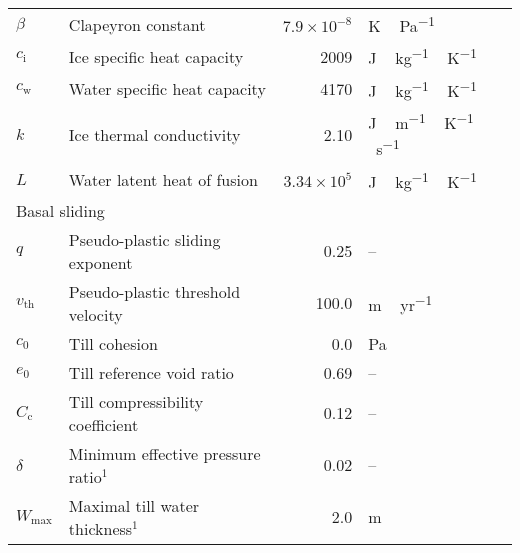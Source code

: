 \documentclass[tc, manuscript]{copernicus}
\begin{document}
\begin{table*}
{\begin{tabular}{llrll}
    $\beta$ & Clapeyron constant
            & $7.9\times10^{-8}$
            & \unit{K\,Pa^{-1}}
            & \citet{Luthi.etal.2002} \\

    $c_{\mathrm{i}}$   & Ice specific heat capacity
            & 2009
            & \unit{J\,kg^{-1}\,K^{-1}}
            & \citet{Aschwanden.etal.2012} \\

    $c_{\mathrm{w}}$   & Water specific heat capacity
            & 4170
            & \unit{J\,kg^{-1}\,K^{-1}}
            & \citet{Aschwanden.etal.2012} \\

    $k$     & Ice thermal conductivity
            & 2.10
            & \unit{J\,m^{-1}\,K^{-1}\,s^{-1}}
            & \citet{Aschwanden.etal.2012} \\

    $L$     & Water latent heat of fusion
            & $3.34\times10^5$
            & \unit{J\,kg^{-1}\,K^{-1}}
            & \citet{Aschwanden.etal.2012} \\

    \cline{1-5}
    \multicolumn{2}{l}{{Basal sliding}} \\
    \cline{1-5}

    $q$     & Pseudo-plastic sliding exponent
            & 0.25
            & --
            & \citet{Aschwanden.etal.2013} \\

    $v_{\text{th}}$& Pseudo-plastic threshold velocity
            & 100.0
            & \unit{m\,yr^{-1}}
            & \citet{Aschwanden.etal.2013} \\

    $c_0$   & Till cohesion
            & 0.0
            & Pa
            & \citet{Tulaczyk.etal.2000} \\
    $e_0$   & Till reference void ratio
            & 0.69
            & --
            & \citet{Tulaczyk.etal.2000} \\

    $C_{\mathrm{c}}$   & Till compressibility coefficient
            & 0.12
            & --
            & \citet{Tulaczyk.etal.2000} \\

    $\delta$& Minimum effective pressure ratio$^1$
            & 0.02
            & --
            & \citet{Bueler.Pelt.2015} \\

    $W_{\text{max}}$ & Maximal till water thickness$^1$
            & 2.0
            & m
            & \citet{Bueler.Pelt.2015} \\


\end{tabular}}
\end{table*}
\end{document}

